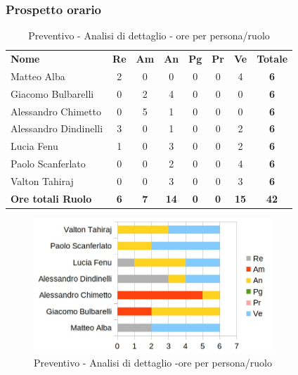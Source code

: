	\subsubsection{Prospetto orario}
	
		\begin{table} [h!]
			\begin{center}
				\begin{tabular} { m{3.5cm} c c c c c c c }
					\rowcolor{lightgray}
					\textbf{Nome} & \textbf{Re} & \textbf{Am} & \textbf{An} & \textbf{Pg} & \textbf{Pr} & \textbf{Ve} & \textbf{Totale} \\
					Matteo Alba & 2 & 0&0 & 0&0 & 4 & \textbf{6} \\
					Giacomo Bulbarelli & 0& 2 & 4 &0 & 0&0 & \textbf{6} \\
					Alessandro Chimetto &0& 5 & 1 &0 &0 &0 & \textbf{6} \\
					Alessandro Dindinelli & 3 &0 & 1 &0 &0 & 2 & \textbf{6} \\
					Lucia Fenu & 1 &0 & 3 &0 & 0& 2 & \textbf{6} \\
					Paolo Scanferlato &0 & 0& 2 & 0&0 & 4 & \textbf{6} \\
					Valton Tahiraj & 0& 0& 3 &0 & 0& 3 & \textbf{6} \\
					\textbf{Ore totali Ruolo} & \textbf{6} & \textbf{7} & \textbf{14} & \textbf{0} & \textbf{0}& \textbf{15} & \textbf{42}
				\end{tabular}
				\caption{Preventivo - Analisi di dettaglio - ore per persona/ruolo}
			\end{center}
		\end{table}
	
		\begin{figure} [h!]
			\centering
			\includegraphics[width=0.8\textwidth]{res/img/grafici/consolidamento_dei_requisiti_ore_ruolo.jpg}
			\caption{Preventivo - Analisi di dettaglio -ore per persona/ruolo} 
		\end{figure}
		
